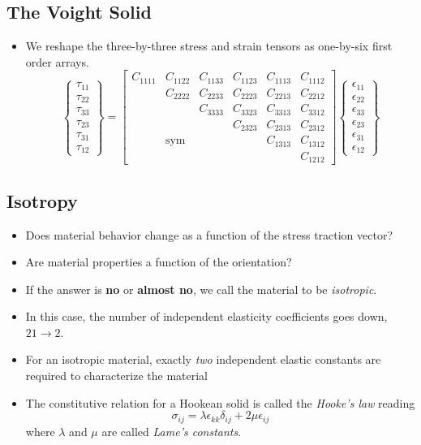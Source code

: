 \documentclass[11pt]{article}
\begin{document}
\subsection*{The Voight Solid}
\label{sec:org5db0f23}
\begin{itemize}
\item We reshape the three-by-three stress and strain tensors as one-by-six first order arrays.
$$ \left\{ \begin{array}{c} \tau_{11} \\ \tau_{22} \\ \tau_{33} \\ \tau_{23} \\ \tau_{31} \\ \tau_{12} \end{array} \right\} = \begin{bmatrix} C_{1111} & C_{1122} & C_{1133} & C_{1123} & C_{1113} & C_{1112} \\
    & C_{2222} & C_{2233} & C_{2223} & C_{2213} & C_{2212} \\
    &  & C_{3333} & C_{3323} & C_{3313} & C_{3312} \\
    &  &  & C_{2323} & C_{2313} & C_{2312} \\
    &  \text{sym} &  &  & C_{1313} & C_{1312} \\
    &  &  &  &  & C_{1212}  \end{bmatrix}   \left\{ \begin{array}{c} \epsilon_{11} \\ \epsilon_{22} \\ \epsilon_{33} \\ \epsilon_{23} \\ \epsilon_{31} \\ \epsilon_{12} \end{array} \right\} $$
\end{itemize}
\subsection*{Isotropy}
\label{sec:org24ddffc}
\begin{itemize}
\item Does material behavior change as a function of the stress traction vector?
\item Are material properties a function of the orientation?
\item If the answer is \textbf{no} or \textbf{almost no}, we call the material to be \emph{isotropic}.
\item In this case, the number of independent elasticity coefficients goes down, \(21 \to 2\).
\item For an isotropic material, exactly \emph{two} independent elastic constants are required to characterize the material
\item The constitutive relation for a Hookean solid is called the \emph{Hooke's law} reading
$$ \sigma_{ij} = \lambda \epsilon_{kk} \delta_{ij} + 2 \mu \epsilon_{ij} $$
where \(\lambda\) and \(\mu\) are called \emph{Lame's constants}.
\end{itemize}
\end{document}
